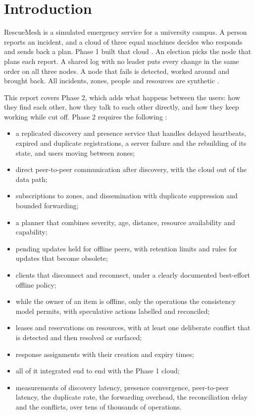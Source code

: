 \section{Introduction}
\label{sec:intro}

RescueMesh is a simulated emergency service for a university campus. A person reports an incident, and a cloud of three equal machines decides who responds and sends back a plan. Phase 1 built that cloud \cite{phase1}. An election picks the node that plans each report. A shared log with no leader puts every change in the same order on all three nodes. A node that fails is detected, worked around and brought back. All incidents, zones, people and resources are synthetic \cite{spec}.

This report covers Phase 2, which adds what happens between the users: how they find each other, how they talk to each other directly, and how they keep working while cut off. Phase 2 requires the following \cite{spec}:

\begin{itemize}
  \item a replicated discovery and presence service that handles delayed heartbeats, expired and duplicate registrations, a server failure and the rebuilding of its state, and users moving between zones;
  \item direct peer-to-peer communication after discovery, with the cloud out of the data path;
  \item subscriptions to zones, and dissemination with duplicate suppression and bounded forwarding;
  \item a planner that combines severity, age, distance, resource availability and capability;
  \item pending updates held for offline peers, with retention limits and rules for updates that become obsolete;
  \item clients that disconnect and reconnect, under a clearly documented best-effort offline policy;
  \item while the owner of an item is offline, only the operations the consistency model permits, with speculative actions labelled and reconciled;
  \item leases and reservations on resources, with at least one deliberate conflict that is detected and then resolved or surfaced;
  \item response assignments with their creation and expiry times;
  \item all of it integrated end to end with the Phase 1 cloud;
  \item measurements of discovery latency, presence convergence, peer-to-peer latency, the duplicate rate, the forwarding overhead, the reconciliation delay and the conflicts, over tens of thousands of operations.
\end{itemize}

